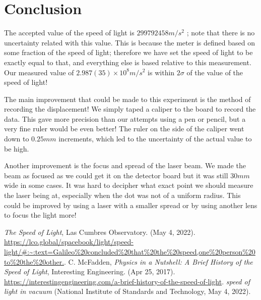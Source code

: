 \documentclass[aps,prl,10pt,twocolumn,floatfix]{revtex4-2}
\begin{document}
\section{Conclusion}
The accepted value of the speed of light is $299792458m/s^2$ \cite{NIST};
note that there is no uncertainty related with this value.
This is because the meter is defined based on some fraction of the speed of light;
therefore we have set the speed of light to be exactly equal to that, and everything else is based relative to this measurement. 
Our measured value of $2.987(35)\times 10^{8}m/s^2$ is within $2\sigma$ of the value of the speed of light!

The main improvement that could be made to this experiment is the method of recording the displacement!
We simply taped a caliper to the board to record the data.
This gave more precision than our attempts using a pen or pencil, but a very fine ruler would be even better!
The ruler on the side of the caliper went down to $0.25mm$ increments, which led to the uncertainty of the actual value to be high.

Another improvement is the focus and spread of the laser beam.
We made the beam as focused as we could get it on the detector board but it was still $30mm$ wide in some cases.
It was hard to decipher what exact point we should measure the laser being at, especially when the dot was not of a uniform radius.
This could be improved by using a laser with a smaller spread or by using another lens to focus the light more!

\begin{thebibliography}{9}
 \textit{The Speed of Light}, Las Cumbres Observatory. (May 4, 2022). \url{https://lco.global/spacebook/light/speed-light/#:~:text=Galileo\%20concluded\%20that\%20the\%20speed,one\%20person\%20to\%20the\%20other.}.
 C. McFadden, \textit{Physics in a Nutshell: A Brief History of the Speed of Light}, Interesting Engineering. (Apr 25, 2017). \url{https://interestingengineering.com/a-brief-history-of-the-speed-of-light}.
 \textit{speed of light in vacuum} (National Institute of Standards and Technology, May 4, 2022).


\end{thebibliography}
\end{document}
